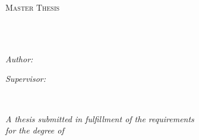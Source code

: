 \documentclass[
11pt, %
english, %
singlespacing, %
headsepline, %
]{MastersDoctoralThesis} %
\author{Gérard \textsc{Tio Nogueras}} %
\begin{document}
\frontmatter %

\pagestyle{plain} %


\begin{titlepage}
\begin{center}

\vspace*{.06\textheight}
{\scshape\LARGE \univname\par}\vspace{1.5cm} %
\textsc{\Large Master Thesis}\\[0.5cm] %

\HRule \\[0.4cm] %
{\huge \bfseries \ttitle\par}\vspace{0.4cm} %
\HRule \\[1.5cm] %
 
\begin{minipage}[t]{0.4\textwidth}
\begin{flushleft} \large
\emph{Author:}\\
\authorname %
\end{flushleft}
\end{minipage}
\begin{minipage}[t]{0.4\textwidth}
\begin{flushright} \large
\emph{Supervisor:} \\
\href{https://directory.unamur.be/staff/jncolin}{\supname} %
\end{flushright}
\end{minipage}\\[3cm]
 
\vfill

\large \textit{A thesis submitted in fulfillment of the requirements\\ for the degree of \degreename}\\[0.3cm] %
 

\end{center}
\end{titlepage}
\end{document}

